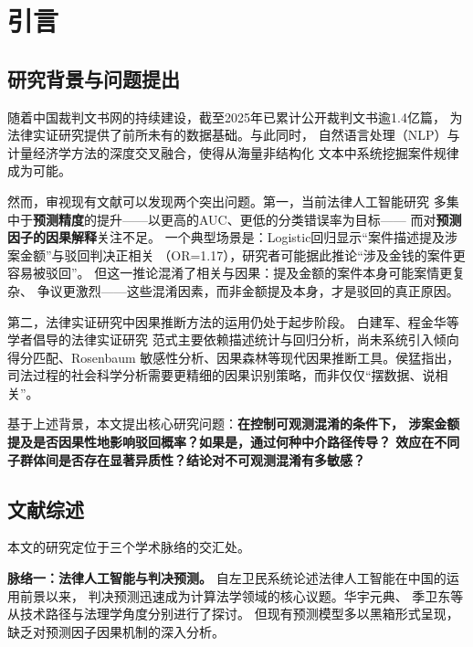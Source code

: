\documentclass[12pt,a4paper,twoside]{ctexart}
\begin{document}
\section{引言}

\subsection{研究背景与问题提出}

随着中国裁判文书网的持续建设，截至2025年已累计公开裁判文书逾1.4亿篇，
为法律实证研究提供了前所未有的数据基础\cite{wang2019}。与此同时，
自然语言处理（NLP）与计量经济学方法的深度交叉融合，使得从海量非结构化
文本中系统挖掘案件规律成为可能\cite{zuo2018,cheng2019}。

然而，审视现有文献可以发现两个突出问题。第一，当前法律人工智能研究
多集中于\textbf{预测精度}的提升——以更高的AUC、更低的分类错误率为目标——
而对\textbf{预测因子的因果解释}关注不足\cite{mullainathan2017}。
一个典型场景是：Logistic回归显示``案件描述提及涉案金额''与驳回判决正相关
（OR=1.17），研究者可能据此推论``涉及金钱的案件更容易被驳回''。
但这一推论混淆了相关与因果：提及金额的案件本身可能案情更复杂、
争议更激烈——这些混淆因素，而非金额提及本身，才是驳回的真正原因。

第二，法律实证研究中因果推断方法的运用仍处于起步阶段。
白建军\cite{bai2017}、程金华\cite{cheng2019}等学者倡导的法律实证研究
范式主要依赖描述统计与回归分析，尚未系统引入倾向得分匹配、Rosenbaum
敏感性分析、因果森林等现代因果推断工具。侯猛\cite{hou2020}指出，
司法过程的社会科学分析需要更精细的因果识别策略，而非仅仅``摆数据、说相关''。

基于上述背景，本文提出核心研究问题：\textbf{在控制可观测混淆的条件下，
涉案金额提及是否因果性地影响驳回概率？如果是，通过何种中介路径传导？
效应在不同子群体间是否存在显著异质性？结论对不可观测混淆有多敏感？}

\subsection{文献综述}

本文的研究定位于三个学术脉络的交汇处。

\textbf{脉络一：法律人工智能与判决预测。}
自左卫民\cite{zuo2018}系统论述法律人工智能在中国的运用前景以来，
判决预测迅速成为计算法学领域的核心议题。华宇元典\cite{huayu2019}、
季卫东\cite{jiweidong2021}等从技术路径与法理学角度分别进行了探讨。
但现有预测模型多以黑箱形式呈现，缺乏对预测因子因果机制的深入分析。
\end{document}
